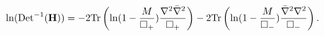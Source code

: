 \begin{equation}\label{hresult}
\ln ({\rm Det}^{-1}({\bf H}))=-2{\rm Tr}\left(\ln
(1-{M\over \Box_{+}}){\nabla^{2}\bar\nabla^{2}\over
\Box_{+}}\right)- 2{\rm Tr}\left(\ln (1-{M\over
\Box_{-}}){\bar\nabla^{2}\nabla^{2}\over
\Box_{-}}\right).
\end{equation}

